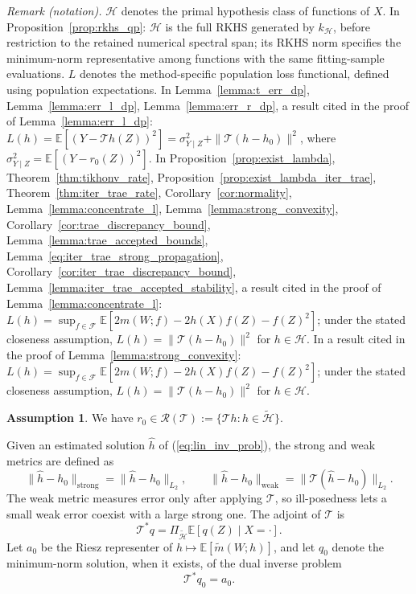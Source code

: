\documentclass[12pt]{article}
\theoremstyle{plain}
\theoremstyle{definition}
\newtheorem{assumption}[theorem]{Assumption}
\theoremstyle{remark}
\begin{document}
\noindent\textit{Remark (notation).} $\mathcal H$ denotes the primal hypothesis class of functions of $X$. In Proposition~\ref{prop:rkhs_qp}: $\mathcal H$ is the full RKHS generated by $k_{\mathcal H}$, before restriction to the retained numerical spectral span; its RKHS norm specifies the minimum-norm representative among functions with the same fitting-sample evaluations. $L$ denotes the method-specific population loss functional, defined using population expectations. In Lemma~\ref{lemma:t_err_dp}, Lemma~\ref{lemma:err_l_dp}, Lemma~\ref{lemma:err_r_dp}, a result cited in the proof of Lemma~\ref{lemma:err_l_dp}: $L(h)=\mathbb E[(Y-\mathcal T h(Z))^2]=\sigma^2_{Y\mid Z}+\|\mathcal T(h-h_0)\|^2$, where $\sigma^2_{Y\mid Z}=\mathbb E[(Y-r_0(Z))^2]$. In Proposition~\ref{prop:exist_lambda}, Theorem~\ref{thm:tikhonv_rate}, Proposition~\ref{prop:exist_lambda_iter_trae}, Theorem~\ref{thm:iter_trae_rate}, Corollary~\ref{cor:normality}, Lemma~\ref{lemma:concentrate_l}, Lemma~\ref{lemma:strong_convexity}, Corollary~\ref{cor:trae_discrepancy_bound}, Lemma~\ref{lemma:trae_accepted_bounds}, Lemma~\ref{eq:iter_trae_strong_propagation}, Corollary~\ref{cor:iter_trae_discrepancy_bound}, Lemma~\ref{lemma:iter_trae_accepted_stability}, a result cited in the proof of Lemma~\ref{lemma:concentrate_l}: $L(h)=\sup_{f\in\mathcal F}\mathbb E[2m(W;f)-2h(X)f(Z)-f(Z)^2]$; under the stated closeness assumption, $L(h)=\|\mathcal T(h-h_0)\|^2$ for $h\in\mathcal H$. In a result cited in the proof of Lemma~\ref{lemma:strong_convexity}: $L(h)=\sup_{f\in\mathcal F}\mathbb E[2m(W;f)-2h(X)f(Z)-f(Z)^2]$; under the stated closeness assumption, $L(h)=\|\mathcal T(h-h_0)\|^2$ for $h\in\mathcal H$.


\begin{assumption}\label{asp:range}
We have $ r_{0} \in \mathcal{R}(\mathcal{T}) :=\{\mathcal{T} h:h\in \tilde{\mathcal{H}}\}$.
\end{assumption}
Given an estimated solution $ \hat{h}$ of (\ref{eq:lin_inv_prob}), the strong and weak metrics are defined as 
\[
\| \hat{h} -h_{0} \| _{\text{strong}} =\| \hat{h} -h_{0} \| _{L_{2}} ,\qquad
\| \hat{h} -h_{0} \| _{\text{weak}} =\| \mathcal{T}(\hat{h} -h_{0}) \| _{L_{2}} .
\]
The weak metric measures error only after applying $\mathcal T$, so ill-posedness lets a small weak error coexist with a large strong one. The adjoint of $\mathcal T$ is 
\[
\mathcal T^*q=\Pi_{\tilde{\mathcal H}}\mathbb E[q(Z)\mid X=\cdot] .
\]
Let $a_0$ be the Riesz representer of $h\mapsto\mathbb E[\tilde m(W;h)]$, and let $q_0$ denote the minimum-norm solution, when it exists, of the dual inverse problem
\[
\mathcal{T^{*}} q_{0} =a_{0} .
\]
\end{document}
